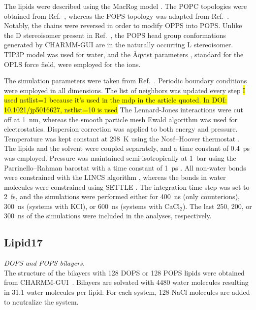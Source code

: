 \documentclass[journal=jpcbfk]{achemso}
\begin{document}
The lipids were described using the MacRog model \cite{maciejewski14,kulig15b,rog16}. The POPC topologies were obtained from 
Ref.~, whereas the POPS topology was adapted from 
Ref.~. Notably, the chains were reversed in order to modify 
OPPS into POPS. Unlike the D stereoisomer present in Ref.~\cite{rog16}, the 
POPS head group conformations generated by CHARMM-GUI are in the naturally occurring L stereoisomer.
TIP3P model \cite{jorgensen83} was used for water, and the \AA{}qvist parameters 
\cite{aqvist90}, standard for the OPLS force field, were employed for the ions. 

The simulation parameters were taken from Ref.~. 
Periodic boundary conditions were employed in all dimensions. The list of neighbors was updated every step 
\hl{I used nstlist=1 because it's used in the mdp in the article quoted. In DOI: 10.1021/jp5016627, nstlist=10 is used}
The Lennard-Jones interactions were cut off at 1~nm, whereas the smooth particle mesh Ewald algorithm 
\cite{essman95} was used for electrostatics. Dispersion correction \cite{shirts07} 
was applied to both energy and pressure. Temperature was kept constant at 298~K using the 
Nos\'{e}--Hoover thermostat \cite{nose84,hoover85}. The lipids and 
the solvent were coupled separately, and a time constant of 0.4~ps was employed. Pressure was 
maintained semi-isotropically at 1~bar using the Parrinello--Rahman barostat with a time constant of 1~ps 
\cite{parrinello81}. All non-water bonds were constrained with the LINCS algorithm 
\cite{hess97,hess07},
whereas the bonds in water molecules were constrained using SETTLE \cite{miyamoto92}.
The integration time step was set to 2~fs, and the simulations were performed either for 400~ns 
(only counterions), 300~ns (systems with KCl), or 600~ns (systems with CaCl$_2$). The last 
250, 200, or 300~ns of the simulations were included in the analyses, respectively.

\subsection{Lipid17}
{\it DOPS and POPS bilayers.} \\

The structure of the bilayers with 128 DOPS or 128 POPS lipids were
obtained from CHARMM-GUI~\cite{lee16,jo18}. Bilayers are solvated with
4480 water molecules resulting in 31.1 water molecules per lipid. For
each system, 128 NaCl molecules are added to neutralize the system.\\
\end{document}
